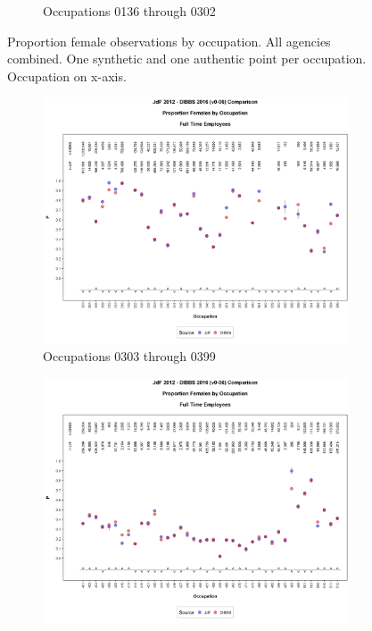 \documentclass[10pt, letterpaper]{article}
\begin{document}
\begin{spacing}{1.0}
\begin{figure}[h]
\begin{subfigure}{1\textwidth}
        \caption{Occupations 0136 through 0302}
        \vspace{10pt}
    \end{subfigure}
    \caption{Proportion female observations by occupation.  All agencies combined.  One synthetic and one authentic point per occupation.  Occupation on x-axis.}
    \label{figure:JdFDIBBSOccupationProportionBar1}
\end{figure}

\clearpage

\begin{figure}[h]
    \centering
    \begin{subfigure}{1\textwidth}
        \centering
        \includegraphics[width=6in, trim={0 1in 0 1in}, clip]{JdFDIBBSOccupationProportionBar81.png}
        \caption{Occupations 0303 through 0399}
        \vspace{10pt}
    \end{subfigure}
    \begin{subfigure}{1\textwidth}
        \centering
        \includegraphics[width=6in, trim={0 1in 0 1in}, clip]{JdFDIBBSOccupationProportionBar121.png}

\end{subfigure}
\end{figure}
\end{spacing}
\end{document}
